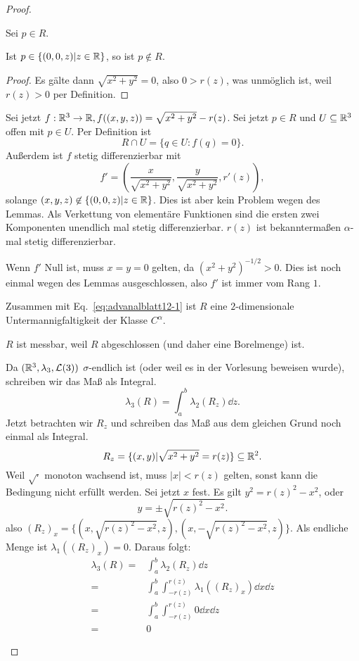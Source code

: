 \begin{proof}
	\begin{parts}
	\item Sei $p\in R$. 
\begin{tcolorbox}[title=Lemma]
	\begin{Lemma}
		Ist $p\in \{(0,0,z)|z\in \mathbb{R}\} $, so ist $p\not\in R$.
	\end{Lemma}
	\begin{proof}
		Es gälte dann $\sqrt{x^2+y^2} =0$, also $0>r(z)$, was unmöglich ist, weil $r(z)>0$ per Definition.
	\end{proof}
\end{tcolorbox}
Sei jetzt $f:\mathbb{R}^{3}\to \mathbb{R},f((x,y,z))=\sqrt{x^2+y^2} -r(z)$. Sei jetzt $p\in R$ und $U\subseteq \mathbb{R}^3$ offen mit $p\in U$. Per Definition ist
\begin{equation}\label{eq:advanalblatt12-1}
R\cap U=\{q\in U:f(q)=0\} 
.\end{equation}
Außerdem ist $f$ stetig differenzierbar mit
 \[
f'=\left( \frac{x}{\sqrt{x^2+y^2} }, \frac{y}{\sqrt{x^2+y^2} },r'(z) \right) 
,\]
solange $(x,y,z) \not\in \{(0,0,z)|z\in \mathbb{R}\} $. Dies ist aber kein Problem wegen des Lemmas. Als Verkettung von elementäre Funktionen sind die ersten zwei Komponenten unendlich mal stetig differenzierbar. $r(z)$ ist bekanntermaßen $\alpha$-mal stetig differenzierbar.

Wenn $f'$ Null ist, muss $x=y=0$ gelten, da $(x^2+y^2)^{-1 / 2}>0$. Dies ist noch einmal wegen des Lemmas ausgeschlossen, also $f'$ ist immer vom Rang $1$.

Zusammen mit Eq.~\eqref{eq:advanalblatt12-1} ist $R$ eine $2$-dimensionale Untermannigfaltigkeit der Klasse $C^\alpha$.
\item $R$ ist messbar, weil $R$ abgeschlossen (und daher eine Borelmenge) ist.

	Da $(\mathbb{R}^3,\lambda_3,\mathcal{L}(3))$ $\sigma$-endlich ist (oder weil es in der Vorlesung beweisen wurde), schreiben wir das Maß als Integral.
\[
	\lambda_3(R)=\int_a^b \lambda_2(R_z)\dd{z}
.\] 
Jetzt betrachten wir $R_z$ und schreiben das Maß aus dem gleichen Grund noch einmal als Integral.
\[
	R_z=\{(x,y)|\sqrt{x^2+y^2} =r(z)\} \subseteq \mathbb{R}^2\\
.\]
Weil $\sqrt{\cdot} $ monoton wachsend ist, muss $|x|<r(z)$ gelten, sonst kann die Bedingung nicht erfüllt werden. Sei jetzt $x$ fest. Es gilt $y^2=r(z)^2-x^2$, oder
\[
y=\pm \sqrt{r(z)^2-x^2} 
.\] 
also $(R_z)_x=\{(x,\sqrt{r(z)^2-x^2} ,z), (x,-\sqrt{r(z)^2-x^2} ,z)\} $. Als endliche Menge ist $\lambda_1((R_z)_x)=0$. Daraus folgt:
\begin{align*}
	\lambda_3(R)=&\int_a^b \lambda_2(R_z)\dd{z}\\
	=&\int_a^b \int_{-r(z)}^{r(z)} \lambda_1((R_z)_x)\dd{x}\dd{z}\\
	=&\int_a^b \int_{-r(z)}^{r(z)} 0\dd{x}\dd{z}\\
	=&0
\end{align*}
	\end{parts}
\end{proof}
